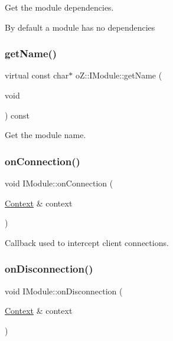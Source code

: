 Get the module dependencies. 

By default a module has no dependencies \mbox{\label{classo_z_1_1_i_module_af41d45158fd28e1bd86a34e25f5282d6}} 
\subsubsection{\texorpdfstring{getName()}{getName()}}
{\footnotesize\ttfamily virtual const char$\ast$ o\+Z\+::\+I\+Module\+::get\+Name (\begin{DoxyParamCaption}\item[{void}]{ }\end{DoxyParamCaption}) const\hspace{0.3cm}{\ttfamily [pure virtual]}}



Get the module name. 

\mbox{\label{classo_z_1_1_i_module_a41527d4435446ad02f815aa0617c6344}} 
\subsubsection{\texorpdfstring{onConnection()}{onConnection()}}
{\footnotesize\ttfamily void I\+Module\+::on\+Connection (\begin{DoxyParamCaption}\item[{\mbox{\hyperlink{classo_z_1_1_context}{Context}} \&}]{context }\end{DoxyParamCaption})\hspace{0.3cm}{\ttfamily [virtual]}}



Callback used to intercept client connections. 

\mbox{\label{classo_z_1_1_i_module_aa8518b9de8d65dcbbdb383ac6f9ccfc2}} 
\subsubsection{\texorpdfstring{onDisconnection()}{onDisconnection()}}
{\footnotesize\ttfamily void I\+Module\+::on\+Disconnection (\begin{DoxyParamCaption}\item[{\mbox{\hyperlink{classo_z_1_1_context}{Context}} \&}]{context }\end{DoxyParamCaption})\hspace{0.3cm}{\ttfamily [virtual]}}



